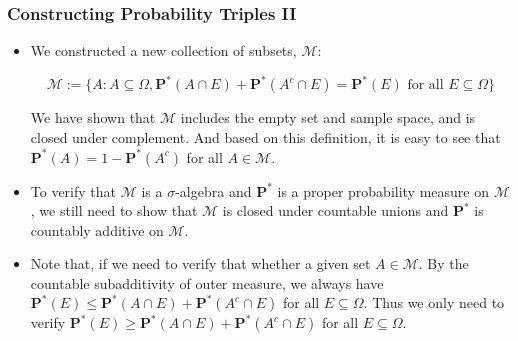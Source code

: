 \documentclass[handout]{beamer}
\newcommand{\BP}{\mathbf{P}}
\begin{document}
\frame
{
  \frametitle{Constructing Probability Triples II }

   \begin{itemize}

      
        \item <1->[4)]   We constructed a new collection of subsets, $\mathcal{M}$:
 
                         $$\mathcal{M}:=\{A: A\subseteq \Omega, \BP^*(A\cap E)+\BP^*(A^c\cap E)=\BP^*(E) \text{ for all }E\subseteq \Omega \}$$

 We have shown that $\mathcal{M}$ includes the empty set and sample space, and is closed under complement. And based on this definition, it is easy to see that $\BP^*(A)=1-\BP^*(A^c)$ for all $A\in\mathcal{M}$. 
 
        \item <2->[5)]  To verify that $\mathcal{M}$ is a $\sigma$-algebra and $\BP^*$ is a proper probability measure on $\mathcal{M}$, we still need to show that $\mathcal{M}$ is closed under countable unions and $\BP^*$ is countably additive on $\mathcal{M}$. 
        
        
        
 
            
           \item<3->[6)]  Note that, if we need to verify that whether a given set $A\in \mathcal{M}$. By the countable subadditivity of outer measure, we always have $\BP^*(E) \leq \BP^*(A\cap E)+\BP^*(A^c\cap E)$ for all $E\subseteq \Omega$. Thus we only need to verify  $\BP^*(E) \geq \BP^*(A\cap E)+\BP^*(A^c\cap E)$ for all $E\subseteq \Omega$. 
           
       
                 \end{itemize}
}
\end{document}
